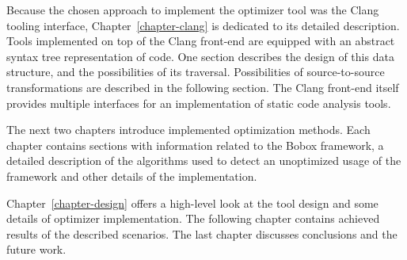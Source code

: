 Because the chosen approach to implement the optimizer tool was the Clang tooling interface, Chapter~\ref{chapter-clang} is dedicated to its detailed description. Tools implemented on top of the Clang front-end are equipped with an abstract syntax tree representation of code. One section describes the design of this data structure, and the possibilities of its traversal. Possibilities of source-to-source transformations are described in the following section. The Clang front-end itself provides multiple interfaces for an implementation of static code analysis tools.

The next two chapters introduce implemented optimization methods. Each chapter contains sections with information related to the Bobox framework, a detailed description of the algorithms used to detect an unoptimized usage of the framework and other details of the implementation.

Chapter~\ref{chapter-design} offers a high-level look at the tool design and some details of optimizer implementation. The following chapter contains achieved results of the described scenarios. The last chapter discusses conclusions and the future work.